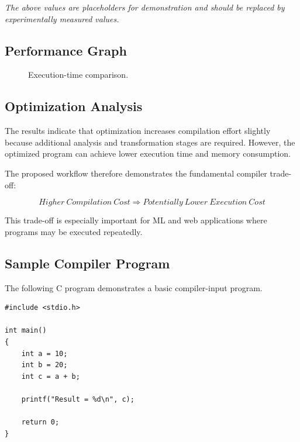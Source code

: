 \documentclass[12pt,a4paper]{article}
\begin{document}
\textit{The above values are placeholders for demonstration and should be
replaced by experimentally measured values.}

\subsection{Performance Graph}

\begin{figure}[H]
\centering
{}
\caption{Execution-time comparison.}
\label{fig:execution}
\end{figure}

\subsection{Optimization Analysis}

The results indicate that optimization increases compilation effort slightly
because additional analysis and transformation stages are required. However,
the optimized program can achieve lower execution time and memory
consumption.

The proposed workflow therefore demonstrates the fundamental compiler
trade-off:

\[
Higher\ Compilation\ Cost
\Rightarrow
Potentially\ Lower\ Execution\ Cost
\]

This trade-off is especially important for ML and web applications where
programs may be executed repeatedly.

\subsection{Sample Compiler Program}

The following C program demonstrates a basic compiler-input program.

\begin{lstlisting}
#include <stdio.h>

int main()
{
    int a = 10;
    int b = 20;
    int c = a + b;

    printf("Result = %d\n", c);

    return 0;
}
\end{lstlisting}
\end{document}
